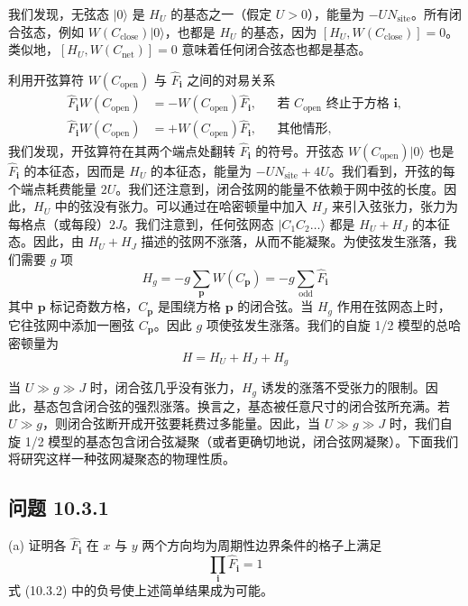 我们发现，无弦态 $|0\rangle$ 是 $H_U$ 的基态之一（假定 $U>0$），能量为 $-UN_{\mathrm{site}}$。所有闭合弦态，例如 $W(C_{\mathrm{close}})|0\rangle$，也都是 $H_U$ 的基态，因为 $[H_U,W(C_{\mathrm{close}})]=0$。类似地，$[H_U,W(C_{\mathrm{net}})]=0$ 意味着任何闭合弦态也都是基态。

利用开弦算符 $W(C_{\mathrm{open}})$ 与 $\hat F_{\pmb{i}}$ 之间的对易关系
\begin{align*}
\hat F_{\pmb{i}}W(C_{\mathrm{open}})&=-W(C_{\mathrm{open}})\hat F_{\pmb{i}}, && \text{若 } C_{\mathrm{open}} \text{ 终止于方格 } \pmb{i},\\
\hat F_{\pmb{i}}W(C_{\mathrm{open}})&=+W(C_{\mathrm{open}})\hat F_{\pmb{i}}, && \text{其他情形},
\end{align*}
我们发现，开弦算符在其两个端点处翻转 $\hat F_{\pmb{i}}$ 的符号。开弦态 $W(C_{\mathrm{open}})|0\rangle$ 也是 $\hat F_{\pmb{i}}$ 的本征态，因而是 $H_U$ 的本征态，能量为 $-UN_{\mathrm{site}}+4U$。我们看到，开弦的每个端点耗费能量 $2U$。我们还注意到，闭合弦网的能量不依赖于网中弦的长度。因此，$H_U$ 中的弦没有张力。可以通过在哈密顿量中加入 $H_J$ 来引入弦张力，张力为每格点（或每段）$2J$。我们注意到，任何弦网态 $|C_1C_2\dots\rangle$ 都是 $H_U+H_J$ 的本征态。因此，由 $H_U+H_J$ 描述的弦网不涨落，从而不能凝聚。为使弦发生涨落，我们需要 $g$ 项
\begin{equation*}
H_g=-g\sum_{\pmb{p}}W(C_{\pmb{p}})=-g\sum_{\mathrm{odd}}\hat F_{\pmb{i}}
\end{equation*}
其中 $\pmb{p}$ 标记奇数方格，$C_{\pmb{p}}$ 是围绕方格 $\pmb{p}$ 的闭合弦。当 $H_g$ 作用在弦网态上时，它往弦网中添加一圈弦 $C_{\pmb{p}}$。因此 $g$ 项使弦发生涨落。我们的自旋 1/2 模型的总哈密顿量为
\begin{equation*}
H=H_U+H_J+H_g
\end{equation*}

当 $U\gg g\gg J$ 时，闭合弦几乎没有张力，$H_g$ 诱发的涨落不受张力的限制。因此，基态包含闭合弦的强烈涨落。换言之，基态被任意尺寸的闭合弦所充满。若 $U\gg g$，则闭合弦断开成开弦要耗费过多能量。因此，当 $U\gg g\gg J$ 时，我们自旋 1/2 模型的基态包含闭合弦凝聚（或者更确切地说，闭合弦网凝聚）。下面我们将研究这样一种弦网凝聚态的物理性质。

\subsection*{问题 10.3.1}

(a) 证明各 $\hat F_{\pmb{i}}$ 在 $x$ 与 $y$ 两个方向均为周期性边界条件的格子上满足
\begin{equation*}
\prod_{\pmb{i}}\hat F_{\pmb{i}}=1\tag{10.3.3}
\end{equation*}
式 (10.3.2) 中的负号使上述简单结果成为可能。

